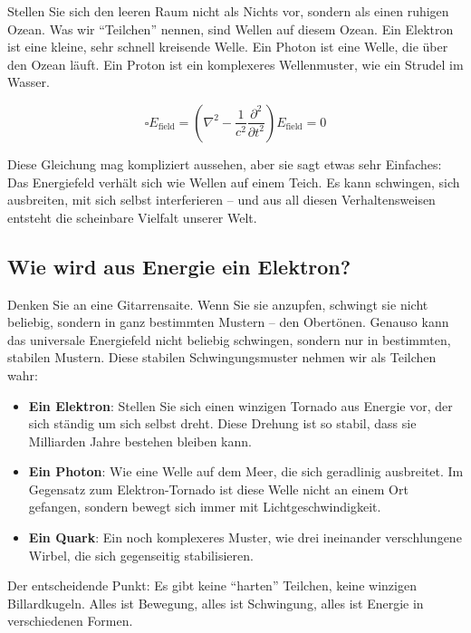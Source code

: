 \documentclass[12pt,a4paper]{article}
\newcommand{\Efield}{E_\text{field}}
\begin{document}
	Stellen Sie sich den leeren Raum nicht als Nichts vor, sondern als einen ruhigen Ozean. Was wir ``Teilchen'' nennen, sind Wellen auf diesem Ozean. Ein Elektron ist eine kleine, sehr schnell kreisende Welle. Ein Photon ist eine Welle, die über den Ozean läuft. Ein Proton ist ein komplexeres Wellenmuster, wie ein Strudel im Wasser.
	
	\begin{equation}
		\boxed{\square \Efield = \left(\nabla^2 - \frac{1}{c^2}\frac{\partial^2}{\partial t^2}\right) \Efield = 0}
	\end{equation}
	
	Diese Gleichung mag kompliziert aussehen, aber sie sagt etwas sehr Einfaches: Das Energiefeld verhält sich wie Wellen auf einem Teich. Es kann schwingen, sich ausbreiten, mit sich selbst interferieren -- und aus all diesen Verhaltensweisen entsteht die scheinbare Vielfalt unserer Welt.
	
	\subsection{Wie wird aus Energie ein Elektron?}
	
	Denken Sie an eine Gitarrensaite. Wenn Sie sie anzupfen, schwingt sie nicht beliebig, sondern in ganz bestimmten Mustern -- den Obertönen. Genauso kann das universale Energiefeld nicht beliebig schwingen, sondern nur in bestimmten, stabilen Mustern. Diese stabilen Schwingungsmuster nehmen wir als Teilchen wahr:
	
	\begin{itemize}
		\item \textbf{Ein Elektron}: Stellen Sie sich einen winzigen Tornado aus Energie vor, der sich ständig um sich selbst dreht. Diese Drehung ist so stabil, dass sie Milliarden Jahre bestehen bleiben kann.
		
		\item \textbf{Ein Photon}: Wie eine Welle auf dem Meer, die sich geradlinig ausbreitet. Im Gegensatz zum Elektron-Tornado ist diese Welle nicht an einem Ort gefangen, sondern bewegt sich immer mit Lichtgeschwindigkeit.
		
		\item \textbf{Ein Quark}: Ein noch komplexeres Muster, wie drei ineinander verschlungene Wirbel, die sich gegenseitig stabilisieren.
	\end{itemize}
	
	Der entscheidende Punkt: Es gibt keine ``harten'' Teilchen, keine winzigen Billardkugeln. Alles ist Bewegung, alles ist Schwingung, alles ist Energie in verschiedenen Formen.
	
\end{document}
